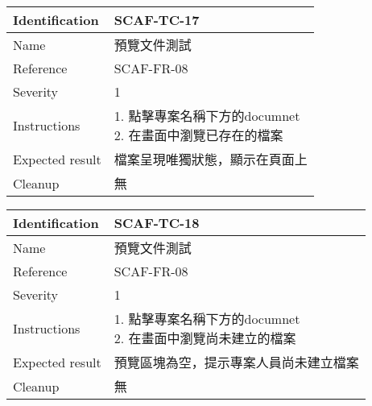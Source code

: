 \documentclass{report}
\begin{document}
\begin{tabularx}{0.9\textwidth}{
  |p{}%
  |p{}|%
  }
  \hline
  \centering Identification &  SCAF-TC-17 \\
  \hline
  \centering Name & 預覽文件測試 \\
  \hline
  \centering Reference & SCAF-FR-08 \\
  \hline
  \centering Severity & 1 \\
  \hline
 \centering Instructions & 
  \makecell{
    1. 點擊專案名稱下方的documnet \\
    2. 在畫面中瀏覽已存在的檔案
  }\\
  \hline
  \centering Expected result & 檔案呈現唯獨狀態，顯示在頁面上 \\
  \hline
  \centering Cleanup & 無 \\
  \hline
\end{tabularx}
\newline\newline

\begin{tabularx}{0.9\textwidth}{
  |p{}%
  |p{}|%
  }
  \hline
  \centering Identification &  SCAF-TC-18 \\
  \hline
  \centering Name & 預覽文件測試 \\
  \hline
  \centering Reference & SCAF-FR-08 \\
  \hline
  \centering Severity & 1 \\
  \hline
 \centering Instructions & 
  \makecell{
    1. 點擊專案名稱下方的documnet \\
    2. 在畫面中瀏覽尚未建立的檔案
  }\\
  \hline
  \centering Expected result & 預覽區塊為空，提示專案人員尚未建立檔案 \\
  \hline
  \centering Cleanup & 無 \\
  \hline
\end{tabularx}
\newline\newline
\end{document}

